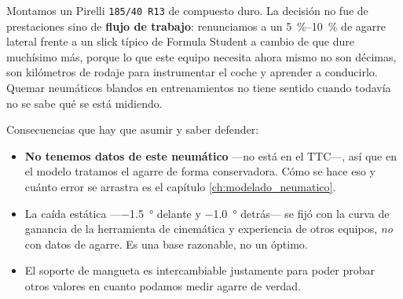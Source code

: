 
\begin{caso}[Pirelli 185/40 R13]
Montamos un Pirelli \texttt{185/40 R13} de compuesto duro. La decisión no fue de
prestaciones sino de \textbf{flujo de trabajo}: renunciamos a un
\SIrange{5}{10}{\percent} de agarre lateral frente a un slick típico de
Formula Student a cambio de que dure muchísimo más, porque lo que este equipo
necesita ahora mismo no son décimas, son kilómetros de rodaje para instrumentar
el coche y aprender a conducirlo. Quemar neumáticos blandos en entrenamientos no
tiene sentido cuando todavía no se sabe qué se está midiendo.

Consecuencias que hay que asumir y saber defender:

\begin{itemize}
  \item \textbf{No tenemos datos de este neumático} ---no está en el TTC---, así
        que en el modelo tratamos el agarre de forma conservadora. Cómo se hace
        eso y cuánto error se arrastra es el capítulo
        \ref{ch:modelado_neumatico}.
  \item La caída estática ---\SI{-1.5}{\degree} delante y \SI{-1.0}{\degree}
        detrás--- se fijó con la curva de ganancia de la herramienta de
        cinemática y experiencia de otros equipos, \emph{no} con datos de agarre.
        Es una base razonable, no un óptimo.
  \item El soporte de mangueta es intercambiable justamente para poder probar
        otros valores en cuanto podamos medir agarre de verdad.
\end{itemize}

\end{caso}

